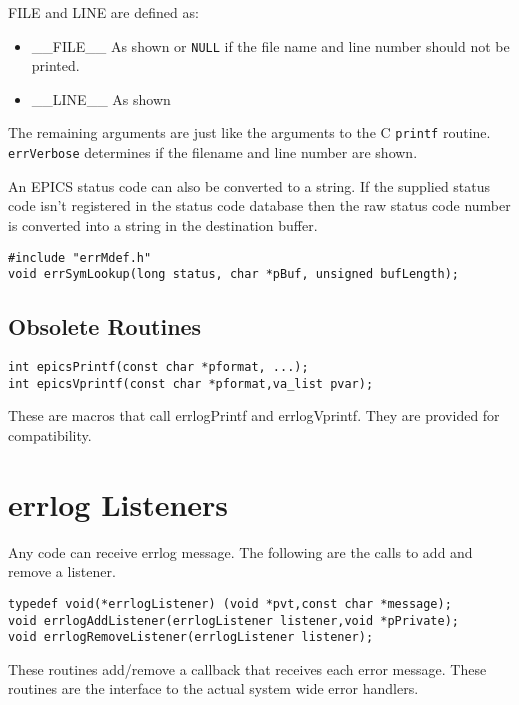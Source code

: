 FILE and LINE are defined as:

\begin{itemize}
\item \_\_FILE\_\_  As shown or \verb|NULL| if the file name and line number should not be printed.

\item \_\_LINE\_\_  As shown

\end{itemize}

The remaining arguments are just like the arguments to the C \verb|printf| routine.
\verb|errVerbose| determines if the filename and line number are shown.

An EPICS status code can also be converted to a string.
If the supplied status code isn't registered in the status code database then the raw status code number is converted into a string in the destination buffer.

\begin{verbatim}
#include "errMdef.h"
void errSymLookup(long status, char *pBuf, unsigned bufLength);
\end{verbatim}

\subsection{Obsolete Routines }

\begin{verbatim}
int epicsPrintf(const char *pformat, ...);
int epicsVprintf(const char *pformat,va_list pvar);
\end{verbatim}

These are macros that call errlogPrintf and errlogVprintf.
They are provided for compatibility.

\section{errlog Listeners}

Any code can receive errlog message.
The following are the calls to add and remove a listener.

\begin{verbatim}
typedef void(*errlogListener) (void *pvt,const char *message);
void errlogAddListener(errlogListener listener,void *pPrivate);
void errlogRemoveListener(errlogListener listener);
\end{verbatim}

These routines add/remove a callback that receives each error message.
These routines are the interface to the actual system wide error handlers.

